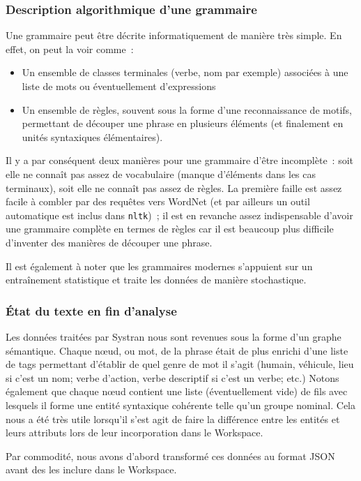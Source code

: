 \documentclass[a4paper, 12pt]{article}
\newcommand{\pyt}[1]{\texttt{#1}}%
\begin{document}
\subsubsection{Description algorithmique d'une grammaire}
Une grammaire peut être décrite informatiquement de manière très simple. En effet, on peut la voir comme~:
\begin{itemize}
	\item Un ensemble de classes terminales (verbe, nom par exemple) associées à une liste de mots ou éventuellement d'expressions
	\item Un ensemble de règles, souvent sous la forme d'une reconnaissance de motifs, permettant de découper une phrase en plusieurs éléments (et finalement en unités syntaxiques élémentaires).
\end{itemize}

Il y a par conséquent deux manières pour une grammaire d'être incomplète~: soit elle ne connaît pas assez de vocabulaire (manque d'éléments dans les cas terminaux), soit elle ne connaît pas assez de règles. La première faille est assez facile à combler par des requêtes vers WordNet (et par ailleurs un outil automatique est inclus dans \pyt{nltk})~; il est en revanche assez indispensable d'avoir une grammaire complète en termes de règles car il est beaucoup plus difficile d'inventer des manières de découper une phrase.

Il est également à noter que les grammaires modernes s'appuient sur un entraînement statistique et traite les données de manière stochastique.

\subsubsection{\'Etat du texte en fin d'analyse}
Les données traitées par Systran nous sont revenues sous la forme d'un graphe sémantique. Chaque nœud, ou mot, de la phrase était de plus enrichi d'une liste de tags permettant d'établir de quel genre de mot il s'agit (humain, véhicule, lieu si c'est un nom; verbe d'action, verbe descriptif si c'est un verbe; etc.) Notons également que chaque nœud contient une liste (éventuellement vide) de fils avec lesquels il forme une entité syntaxique cohérente telle qu'un groupe nominal. Cela nous a été très utile lorsqu'il s'est agit de faire la différence entre les entités et leurs attributs lors de leur incorporation dans le Workspace.

Par commodité, nous avons d'abord transformé ces données au format JSON avant des les inclure dans le Workspace.
\end{document}
